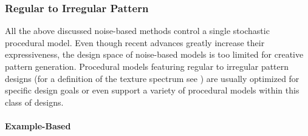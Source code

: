 

\subsubsection{Regular to Irregular Pattern}
\label{subsubsec:analysis_distribution_and_repetition_regular}

All the above discussed noise-based methods control a single stochastic procedural model. Even though recent advances greatly increase their expressiveness, the design space of noise-based models is too limited for creative pattern generation. Procedural models featuring regular to irregular pattern designs (for a definition of the texture spectrum see \cite{lin_2006_qeo}) are usually optimized for specific design goals or even support a variety of procedural models within this class of designs.

\paragraph*{Example-Based}
\label{para:analysis_regular_example}


